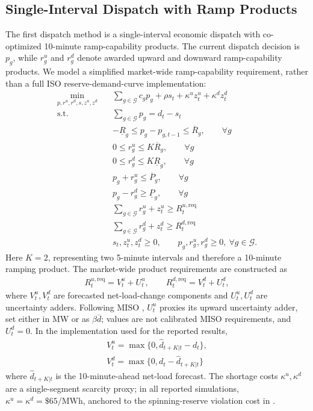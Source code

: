 \documentclass[conference]{IEEEtran}
\begin{document}
\subsection{Single-Interval Dispatch with Ramp Products}
The first dispatch method is a single-interval economic dispatch with co-optimized 10-minute ramp-capability products. The current dispatch decision is $p_g$, while $r^u_g$ and $r^d_g$ denote awarded upward and downward ramp-capability products. We model a simplified market-wide ramp-capability requirement, rather than a full ISO reserve-demand-curve implementation:
\begin{align}
\min_{p,r^u,r^d,s,z^u,z^d} \quad
& \sum_{g\in\mathcal{G}} c_g p_g + \rho s_t + \kappa^u z_t^u + \kappa^d z_t^d \label{eq:rp_obj}\\
\text{s.t.}\quad
& \sum_{g\in\mathcal{G}} p_g = d_t - s_t \label{eq:rp_balance}\\
& -\underline R_g \le p_g - p_{g,t-1} \le \overline R_g, \qquad \forall g \label{eq:rp_prev}\\
& 0 \le r^u_g \le K \overline R_g, \qquad \forall g \label{eq:rp_ru}\\
& 0 \le r^d_g \le K \underline R_g, \qquad \forall g \label{eq:rp_rd}\\
& p_g + r^u_g \le \overline P_g, \qquad \forall g \label{eq:rp_head}\\
& p_g - r^d_g \ge \underline P_g, \qquad \forall g \label{eq:rp_foot}\\
& \sum_{g\in\mathcal{G}} r^u_g + z_t^u \ge R_t^{u,\mathrm{req}} \label{eq:rp_sysu}\\
& \sum_{g\in\mathcal{G}} r^d_g + z_t^d \ge R_t^{d,\mathrm{req}} \label{eq:rp_sysd}\\
& s_t, z_t^u, z_t^d \ge 0, \qquad
  p_g, r^u_g, r^d_g \ge 0,\ \forall g \in \mathcal{G}. \label{eq:rp_shed}
\end{align}
Here $K=2$, representing two 5-minute intervals and therefore a 10-minute ramping product. The market-wide product requirements are constructed as
\begin{align}
R_t^{u,\mathrm{req}} = V_t^u + U_t^u, \qquad
R_t^{d,\mathrm{req}} = V_t^d + U_t^d, \label{eq:rp_req}
\end{align}
where $V_t^u,V_t^d$ are forecasted net-load-change components and $U_t^u,U_t^d$ are uncertainty adders. Following MISO \cite{MISO2026RCPUncertainty}, $U_t^u$ proxies its upward uncertainty adder, set either in MW or as $\beta\bar d$; values are not calibrated MISO requirements, and $U_t^d=0$. In the implementation used for the reported results,
\begin{align}
V_t^u = \max\{0, \widehat d_{t+K|t}-d_t\}, \\
V_t^d = \max\{0, d_t-\widehat d_{t+K|t}\} \label{eq:rp_var}
\end{align}
where $\widehat d_{t+K|t}$ is the 10-minute-ahead net-load forecast. The shortage costs $\kappa^u,\kappa^d$ are a single-segment scarcity proxy; in all reported simulations, $\kappa^u=\kappa^d=\$65/\text{MWh}$, anchored to the spinning-reserve violation cost in \cite{Chen2023}.
\end{document}
